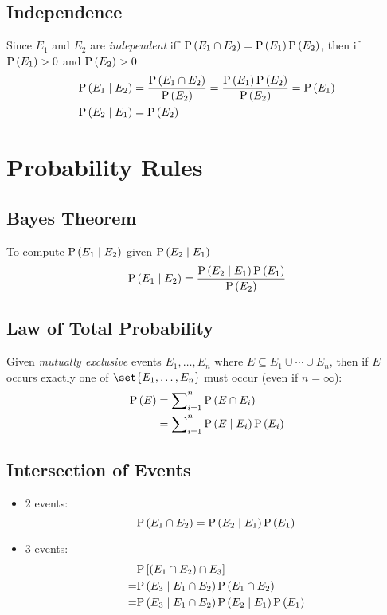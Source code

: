 \subsection*{Independence}

Since $E_1$ and $E_2$ are \textit{independent} iff $\mathrm{P} \left( E_1 \cap E_2 \right) = \mathrm{P} \left( E_1 \right) \mathrm{P} \left( E_2 \right)$, then if $\mathrm{P} \left( E_1 \right) > 0$ and $\mathrm{P} \left( E_2 \right) > 0$
\begin{align*}
    \mathrm{P} \left( E_1 \mid E_2 \right)
    &= \frac{\mathrm{P} \left( E_1 \cap E_2 \right)}{\mathrm{P} \left( E_2 \right)}
    = \frac{\mathrm{P} \left( E_1 \right) \mathrm{P} \left( E_2 \right)}{\mathrm{P} \left( E_2 \right)}
    = \mathrm{P} \left( E_1 \right) \\
    \mathrm{P} \left( E_2 \mid E_1 \right)
    &= \mathrm{P} \left( E_2 \right)
\end{align*}

\section*{Probability Rules}

\subsection*{Bayes Theorem}

To compute $\mathrm{P} \left( E_1 \mid E_2 \right)$ given $\mathrm{P} \left( E_2 \mid E_1 \right)$
\begin{equation*}
    \mathrm{P} \left( E_1 \mid E_2 \right)
    = \frac{\mathrm{P} \left( E_2 \mid E_1 \right) \mathrm{P} \left( E_1 \right)}{\mathrm{P} \left( E_2 \right)}
\end{equation*}

\subsection*{Law of Total Probability}

Given \textit{mutually exclusive} events $E_1, \dots, E_n$ where $E \subseteq E_1 \cup \cdots \cup E_n$, then if $E$ occurs exactly one of $\set{ E_1, \dots, E_n }$ must occur (even if $n = \infty$):
\begin{align*}
    \mathrm{P} \left( E \right)
    &= \sum \nolimits_{i = 1}^{n} \mathrm{P} \left( E \cap E_i \right) \\
    &= \sum \nolimits_{i = 1}^{n} \mathrm{P} \left( E \mid E_i \right) \mathrm{P} \left( E_i \right)
\end{align*}

\subsection*{Intersection of Events}

\begin{itemize}
    \item 2 events:
    \begin{equation*}
        \mathrm{P} \left( E_1 \cap E_2 \right) = \mathrm{P} \left( E_2 \mid E_1 \right) \mathrm{P} \left( E_1 \right)
    \end{equation*}
    \item 3 events:
    \begin{align*}
        &\mathrm{P} \left[ (E_1 \cap E_2) \cap E_3 \right] \\
        = &\mathrm{P} \left( E_3 \mid E_1 \cap E_2 \right) \mathrm{P} \left( E_1 \cap E_2 \right) \\
        = &\mathrm{P} \left( E_3 \mid E_1 \cap E_2 \right) \mathrm{P} \left( E_2 \mid E_1 \right) \mathrm{P} \left( E_1 \right)
    \end{align*}
\end{itemize}

